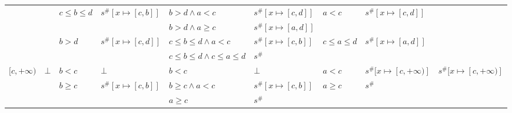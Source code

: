 \documentclass{beamer}
\begin{document}
\begin{frame}
\begin{table}
{\begin{tabular}{|l|l|ll|ll|ll|l|}
                                        &                         & \multirow{2}{*}{$c \le b \le d$} & \multirow{2}{*}{$s^\#[x \mapsto [c, b]]$}       & $b > d \land a < c$                 & $s^\#[x \mapsto [c, d]]$ & \multirow{2}{*}{$a < c$}         & \multirow{2}{*}{$s^\#[x \mapsto [c, d]]$} &                                                 \\
                                        &                         &                                  &                                                 & $b > d \land a \ge c$               & $s^\#[x \mapsto [a, d]]$ &                                  &                                           &                                                 \\
                                        &                         & \multirow{2}{*}{$b > d$}         & \multirow{2}{*}{$s^\#[x \mapsto [c, d]]$}       & $c \le b \le d \land a < c$         & $s^\#[x \mapsto [c, b]]$ & \multirow{2}{*}{$c \le a \le d$} & \multirow{2}{*}{$s^\#[x \mapsto [a, d]]$} &                                                 \\
                                        &                         &                                  &                                                 & $c \le b \le d \land c \le a \le d$ & $s^\#$                   &                                  &                                           &                                                 \\ \hline
        \multirow{3}{*}{$[c, +\infty)$} & \multirow{3}{*}{$\bot$} & $b < c$                          & $\bot$                                          & $b < c$                             & $\bot$                   & $a < c$                          & $s^\#[x \mapsto [c, +\infty)]$            & \multirow{3}{*}{$s^\#[x \mapsto [c, +\infty)]$} \\
                                        &                         & \multirow{2}{*}{$b \ge c$}       & \multirow{2}{*}{$s^\#[x \mapsto [c, b]]$}       & $b \ge c \land a < c$               & $s^\#[x \mapsto [c, b]]$ & \multirow{2}{*}{$a \ge c$}       & \multirow{2}{*}{$s^\#$}                   &                                                 \\
                                        &                         &                                  &                                                 & $a \ge c$                           & $s^\#$                   &                                  &                                           &                                                 \\ \hline

\end{tabular}}
\end{table}
\end{frame}
\end{document}
